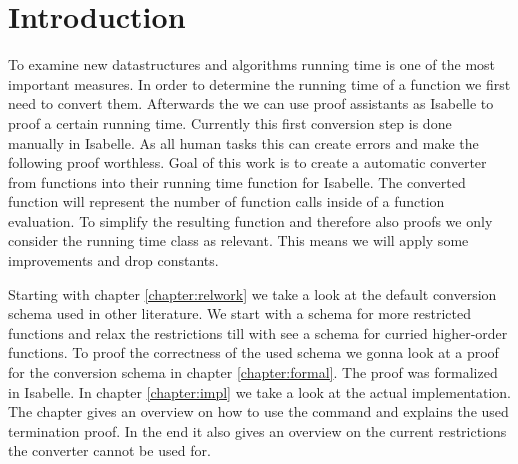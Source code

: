 \chapter{Introduction}\label{chapter:introduction}

To examine new datastructures and algorithms running time is one of the most important measures.
In order to determine the running time of a function we first need to convert them.
Afterwards the we can use proof assistants as Isabelle to proof a certain running time.
Currently this first conversion step is done manually in Isabelle.
As all human tasks this can create errors and make the following proof worthless.
Goal of this work is to create a automatic converter from functions into their running time function for Isabelle.
The converted function will represent the number of function calls inside of a function evaluation.
To simplify the resulting function and therefore also proofs we only consider the running time class as relevant.
This means we will apply some improvements and drop constants.

Starting with chapter \ref{chapter:relwork} we take a look at the default conversion schema used in other literature. We start with a schema for more restricted functions and relax the restrictions till with see a schema for curried higher-order functions.
To proof the correctness of the used schema we gonna look at a proof for the conversion schema in chapter \ref{chapter:formal}. The proof was formalized in Isabelle.
In chapter \ref{chapter:impl} we take a look at the actual implementation. The chapter gives an overview on how to use the command and explains the used termination proof. In the end it also gives an overview on the current restrictions the converter cannot be used for.
